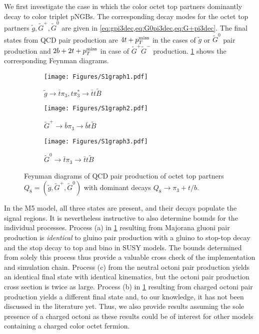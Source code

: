 \documentclass[preprintnumbers,nofootinbib,showpacs,eqsecnum,pre,12pt]{revtex4-1}
\def\ptmiss{p_{T}^{\rm miss}}
\begin{document}
We first investigate the case in which the color octet top partners dominantly decay to color triplet pNGBs. The corresponding decay modes for the octet top partners $\tilde g,\tilde G^+,\tilde G^0$ are given in \cref{eq:gpi3dec,eq:G0pi3dec,eq:G+pi3dec}. The final states from QCD pair production are $4 t + \ptmiss$ in the cases of $\tilde g$ or $\tilde G^0$ pair production and
$2b + 2t + \ptmiss$ in case of $\tilde G^+\tilde G^-$ production. 
\cref{fig:S1graphs} shows the corresponding Feynman diagrams.

\begin{figure}[t]
{	\centering
		\begin{subfigure}[]{0.31\linewidth}
		\centering
		\texttt{[image: Figures/S1graph1.pdf]} 
		\caption{$\tilde g\to \bar t\pi_3, t\pi_3^*\to \bar t t\tilde B$}
		\end{subfigure}
				\begin{subfigure}[]{0.31\linewidth}
		\centering
		\texttt{[image: Figures/S1graph2.pdf]} 
		\caption{$\tilde G^+\to \bar b\pi_3\to \bar bt\tilde B$}
		\end{subfigure}
				\begin{subfigure}[]{0.31\linewidth}
		\centering
		\texttt{[image: Figures/S1graph3.pdf]} 
		\caption{$\tilde G^0\to \bar t\pi_3\to \bar tt\tilde B$}
		\end{subfigure}
		}
	\caption{Feynman diagrams of QCD pair production of octet top partners $Q_8=(\tilde g,\tilde G^+,\tilde G^0)$ with dominant decays  $Q_8\to\pi_3+t/b$.}	
	\label{fig:S1graphs}
\end{figure}

In the M5 model, all three states are present, and their decays populate the signal regions. It is nevertheless instructive to also determine bounds for the individual processes. Process (a) in \cref{fig:S1graphs} resulting from Majorana gluoni pair production is \emph{identical} to gluino pair production with a gluino to stop-top decay and the stop decay to top and bino in SUSY models. The bounds determined from solely this process thus provide a valuable cross check of the implementation and simulation chain. Process (c) from the neutral octoni pair production yields an identical final state with identical kinematics, but the octoni pair production cross section is twice as large. Process (b) in \cref{fig:S1graphs} resulting from charged octoni pair production yields a different final state and, to our knowledge, it has not been discussed in the literature yet. Thus, we also provide results assuming the sole presence of a charged octoni as these results could be of interest for other models containing a charged color octet fermion.
\end{document}
